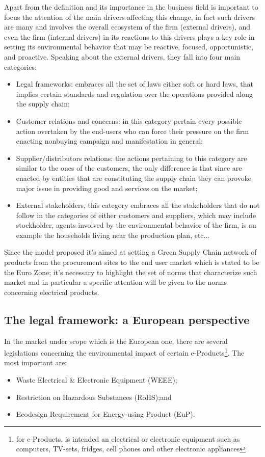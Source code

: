 \begin{doublespace}
  Apart from the definition and its importance in the business field is important to focus the attention of the main drivers affecting this change, in fact such drivers are many and involves the overall ecosystem of the firm (external drivers), and even the firm (internal drivers) in its reactions to this drivers plays a key role in setting its environmental behavior that may be reactive, focused, opportunistic, and proactive\cite{YolLee2007}. Speaking about the external drivers, they fall into four main categories:
  \begin{itemize}
	  \item Legal frameworks: embraces all the set of laws either soft or hard laws, that implies certain standards and regulation over the operations provided along the supply chain;
	  \item Customer relations and concerns: in this category pertain every possible action overtaken by the end-users who can force their pressure on the firm enacting nonbuying campaign and manifestation in general;
	  \item Supplier/distributors relations: the actions pertaining to this category are similar to the ones of the customers, the only difference is that since are enacted    by entities that are constituting the supply chain they can provoke major issue in providing good and services on the market;
	  \item External stakeholders, this category embraces all the stakeholders that do not follow in the categories of either customers and suppliers, which may include stockholder, agents involved by the environmental behavior of the firm, is an example the households living near the production plan, etc...
  \end{itemize}
Since the model proposed it's aimed at setting a Green Supply Chain network of products from the procurement sites to the end user market which is stated to be the Euro Zone; it's necessary to highlight the set of norms that characterize such market and in particular a specific attention will be given to the norms concerning electrical products.

  \subsection{The legal framework: a European perspective}
  In the market under scope which is the European one, there are several legislations concerning the environmental impact of certain e-Products\footnote{for e-Products, is intended an electrical or electronic equipment such as computers, TV-sets, fridges, cell phones and other electronic appliances}. The most important are:
  \begin{itemize}
    \item Waste Electrical \& Electronic Equipment (WEEE);
    \item Restriction on Hazardous Substances (RoHS);and
    \item Ecodesign Requirement for Energy-using Product (EuP).
  \end{itemize}


\end{doublespace}
